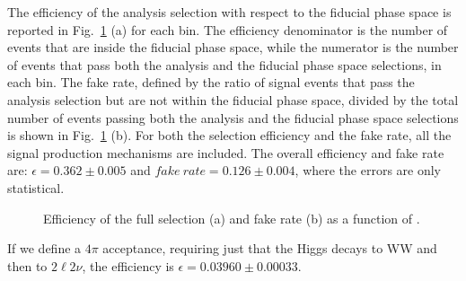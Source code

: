 The efficiency of the analysis selection with respect to the fiducial phase space is reported in Fig.~\ref{fig:sel_eff} (a) for each \pth bin. The efficiency denominator is the number of events that are inside the fiducial phase space, while the numerator is the number of events that pass both the analysis and the fiducial phase space selections, in each \pth bin. The fake rate, defined by the ratio of signal events that pass the analysis selection but are not within the fiducial phase space, divided by the total number of events passing both the analysis and the fiducial phase space selections is shown in Fig.~\ref{fig:sel_eff} (b). For both the selection efficiency and the fake rate, all the signal production mechanisms are included.
The overall efficiency and fake rate are: $\epsilon=0.362\pm{0.005}$ and $fake~rate=0.126\pm0.004$, where the errors are only statistical.

\begin{figure}[t]
\centering
{}
\caption{Efficiency of the full selection (a) and fake rate (b) as a function of \pth.\label{fig:sel_eff}}
\end{figure}


If we define a $4\pi$ acceptance, requiring just that the Higgs decays to WW and then to $2\ell2\nu$, the efficiency is $\epsilon=0.03960\pm{0.00033}$. 





